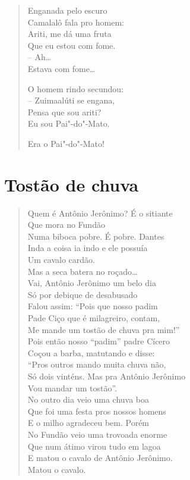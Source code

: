 {\begin{verse}
Enganada pelo escuro\\
Camalalô fala pro homem:\\
Ariti, me dá uma fruta\\
Que eu estou com fome.\\
\qquad-- Ah\ldots{}\\
Estava com fome\ldots{}

O homem rindo secundou:\\
-- Zuimaalúti se engana,\\
Pensa que sou ariti?\\
Eu sou Pai"-do"-Mato.

Era o Pai"-do"-Mato!
\end{verse}

\chapter{Tostão de chuva}

\begin{verse}
Quem é Antônio Jerônimo? É o sitiante\\
\qquad\quad{}Que mora no Fundão\\
Numa biboca pobre. É pobre. Dantes\\
Inda a coisa ia indo e ele possuía\\
\qquad\quad{}Um cavalo cardão.\\
Mas a seca batera no roçado\ldots{}\\
Vai, Antônio Jerônimo um belo dia\\
Só por debique de desabusado\\
Falou assim: ``Pois que nosso padim\\
Pade Ciço que é milagreiro, contam,\\
Me mande um tostão de chuva pra mim!''\\
Pois então nosso ``padim'' padre Cícero\\
Coçou a barba, matutando e disse:\\
``Pros outros mando muita chuva não,\\
Só dois vinténs. Mas pra Antônio Jerônimo\\
\qquad\quad{}Vou mandar um tostão''.\\
No outro dia veio uma chuva boa\\
Que foi uma festa pros nossos homens\\
E o milho agradeceu bem. Porém\\
No Fundão veio uma trovoada enorme\\
Que num átimo virou tudo em lagoa\\
E matou o cavalo de Antônio Jerônimo.\\
\qquad\quad{}Matou o cavalo.
\end{verse}

}
